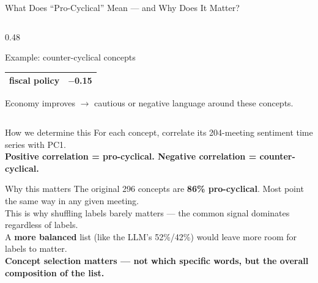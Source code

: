 \documentclass[10pt,aspectratio=169]{beamer}
\begin{document}
\begin{frame}{What Does ``Pro-Cyclical'' Mean --- and Why Does It Matter?}
\begin{columns}[T]
\begin{column}{0.48\textwidth}
\begin{block}{Example: counter-cyclical concepts}
\begin{tabular}{lr}
          fiscal policy       & $-$0.15 \\
          \bottomrule
        \end{tabular}
        \vspace{2pt}
        Economy improves $\to$ cautious or negative language around these concepts.
      \end{block}
    \end{column}
  \end{columns}
  \vspace{4pt}
  \begin{block}{How we determine this}
    \centering\small
    For each concept, correlate its 204-meeting sentiment time series with PC1.\\
    \textbf{Positive correlation = pro-cyclical. Negative correlation = counter-cyclical.}
  \end{block}
  \vspace{2pt}
  \begin{alertblock}{Why this matters}
    \small
    The original 296 concepts are \textbf{86\% pro-cyclical}. Most point the same way in any given meeting.\\
    This is why shuffling labels barely matters --- the common signal dominates regardless of labels.\\
    A \textbf{more balanced} list (like the LLM's 52\%/42\%) would leave more room for labels to matter.\\[2pt]
    \textbf{Concept selection matters --- not which specific words, but the overall composition of the list.}
  \end{alertblock}
\end{frame}

\end{document}
